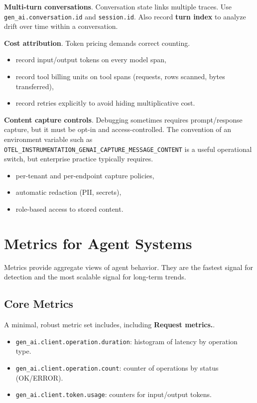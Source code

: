 \textbf{Multi-turn conversations}. Conversation state links multiple traces. Use \texttt{gen\_ai.conversation.id} and \texttt{session.id}. Also record \textbf{turn index} to analyze drift over time within a conversation.

\textbf{Cost attribution}. Token pricing demands correct counting.
\begin{itemize}
\item record input/output tokens on every model span,
\item record tool billing units on tool spans (requests, rows scanned, bytes transferred),
\item record retries explicitly to avoid hiding multiplicative cost.
\end{itemize}

\textbf{Content capture controls}. Debugging sometimes requires prompt/response capture, but it must be opt-in and access-controlled. The convention of an environment variable such as
\texttt{OTEL\_INSTRUMENTATION\_GENAI\_CAPTURE\_MESSAGE\_CONTENT}
is a useful operational switch, but enterprise practice typically requires.
\begin{itemize}
\item per-tenant and per-endpoint capture policies,
\item automatic redaction (PII, secrets),
\item role-based access to stored content.
\end{itemize}

\section{Metrics for Agent Systems}

Metrics provide aggregate views of agent behavior. They are the fastest signal for detection and the most scalable signal for long-term trends.

\subsection{Core Metrics}

A minimal, robust metric set includes, including \textbf{Request metrics.}.
\begin{itemize}
\item \texttt{gen\_ai.client.operation.duration}: histogram of latency by operation type.
\item \texttt{gen\_ai.client.operation.count}: counter of operations by status (OK/ERROR).
\item \texttt{gen\_ai.client.token.usage}: counters for input/output tokens.
\end{itemize}

